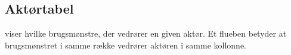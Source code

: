 

\subsection{Aktørtabel}
 viser hvilke brugsmønstre, der vedrører en given aktør. Et flueben betyder at brugsmønstret i samme række vedrører aktøren i samme kollonne.






